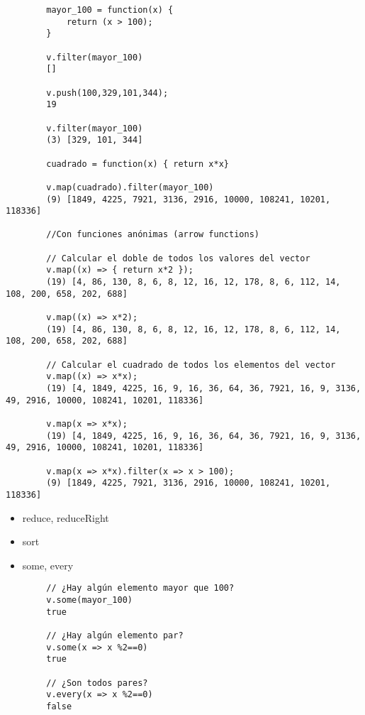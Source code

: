 \begin{verbatim}
        mayor_100 = function(x) {
            return (x > 100);
        }
       
        v.filter(mayor_100)
        []

        v.push(100,329,101,344);
        19

        v.filter(mayor_100)
        (3) [329, 101, 344]

        cuadrado = function(x) { return x*x}

        v.map(cuadrado).filter(mayor_100)
        (9) [1849, 4225, 7921, 3136, 2916, 10000, 108241, 10201, 118336]

        //Con funciones anónimas (arrow functions)
        
        // Calcular el doble de todos los valores del vector
        v.map((x) => { return x*2 });
        (19) [4, 86, 130, 8, 6, 8, 12, 16, 12, 178, 8, 6, 112, 14, 108, 200, 658, 202, 688]

        v.map((x) => x*2);
        (19) [4, 86, 130, 8, 6, 8, 12, 16, 12, 178, 8, 6, 112, 14, 108, 200, 658, 202, 688]

        // Calcular el cuadrado de todos los elementos del vector
        v.map((x) => x*x);
        (19) [4, 1849, 4225, 16, 9, 16, 36, 64, 36, 7921, 16, 9, 3136, 49, 2916, 10000, 108241, 10201, 118336]

        v.map(x => x*x);
        (19) [4, 1849, 4225, 16, 9, 16, 36, 64, 36, 7921, 16, 9, 3136, 49, 2916, 10000, 108241, 10201, 118336]

        v.map(x => x*x).filter(x => x > 100);
        (9) [1849, 4225, 7921, 3136, 2916, 10000, 108241, 10201, 118336]
\end{verbatim}

\begin{itemize}
\tightlist
\item
  reduce, reduceRight
\item
  sort
\item
  some, every
\end{itemize}

\begin{verbatim}
        // ¿Hay algún elemento mayor que 100?
        v.some(mayor_100)
        true

        // ¿Hay algún elemento par?
        v.some(x => x %2==0)
        true

        // ¿Son todos pares?
        v.every(x => x %2==0)
        false
\end{verbatim}

